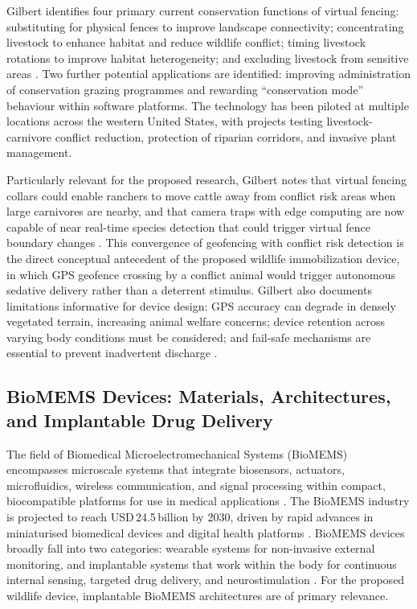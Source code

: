 \documentclass[12pt,a4paper]{article}
\begin{document}
    Gilbert identifies four primary current conservation functions of virtual fencing:
    substituting for physical fences to improve landscape connectivity; concentrating livestock
    to enhance habitat and reduce wildlife conflict; timing livestock rotations to improve habitat
    heterogeneity; and excluding livestock from sensitive areas \cite{gilbert2026}. Two further
    potential applications are identified: improving administration of conservation grazing
    programmes and rewarding ``conservation mode'' behaviour within software platforms. The
    technology has been piloted at multiple locations across the western United States, with
    projects testing livestock-carnivore conflict reduction, protection of riparian corridors,
    and invasive plant management.

    Particularly relevant for the proposed research, Gilbert notes that virtual fencing collars
    could enable ranchers to move cattle away from conflict risk areas when large carnivores
    are nearby, and that camera traps with edge computing are now capable of near real-time
    species detection that could trigger virtual fence boundary changes \cite{gilbert2026}. This
    convergence of geofencing with conflict risk detection is the direct conceptual antecedent
    of the proposed wildlife immobilization device, in which GPS geofence crossing by a conflict
    animal would trigger autonomous sedative delivery rather than a deterrent stimulus. Gilbert
    also documents limitations informative for device design: GPS accuracy can degrade in
    densely vegetated terrain, increasing animal welfare concerns; device retention across
    varying body conditions must be considered; and fail-safe mechanisms are essential to
    prevent inadvertent discharge \cite{gilbert2026}.

    \subsection{BioMEMS Devices: Materials, Architectures, and Implantable Drug Delivery}

    The field of Biomedical Microelectromechanical Systems (BioMEMS) encompasses
    microscale systems that integrate biosensors, actuators, microfluidics, wireless
    communication, and signal processing within compact, biocompatible platforms for use in
    medical applications \cite{abhinav2025}. The BioMEMS industry is projected to reach
    USD\,24.5\,billion by 2030, driven by rapid advances in miniaturised biomedical devices and
    digital health platforms \cite{abhinav2025}. BioMEMS devices broadly fall into two
    categories: wearable systems for non-invasive external monitoring, and implantable systems
    that work within the body for continuous internal sensing, targeted drug delivery, and
    neurostimulation \cite{abhinav2025}. For the proposed wildlife device, implantable BioMEMS
    architectures are of primary relevance.
\end{document}
